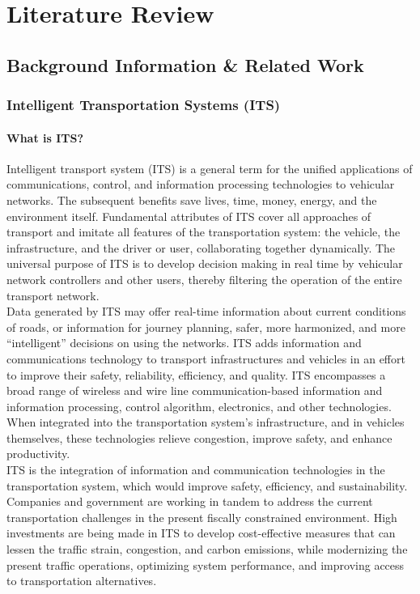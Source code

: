 \chapter{Literature Review}
	\label{chap: literature_review}
	
	\section{Background Information \& Related Work}
		\subsection{Intelligent Transportation Systems (ITS)}
			\subsubsection{What is ITS?}
			Intelligent transport system (ITS) is a general term for the unified applications of communications, control, and information processing technologies to vehicular networks. The subsequent benefits save lives, time, money, energy, and the environment itself. Fundamental attributes of ITS cover all approaches of transport and imitate all features of the transportation system: the vehicle, the infrastructure, and the driver or user, collaborating together dynamically. The universal purpose of ITS is to develop decision making in real time by vehicular network controllers and other users, thereby filtering the operation of the entire transport network. \\
			Data generated by ITS may offer real-time information about current conditions of roads, or information for journey planning, safer, more harmonized, and more “intelligent” decisions on using the networks. ITS adds information and communications technology to transport infrastructures and vehicles in an effort to improve their safety, reliability, efficiency, and quality. ITS encompasses a broad range of wireless and wire line communication-based information and information processing, control algorithm, electronics, and other technologies. When integrated into the transportation system’s infrastructure, and in vehicles themselves, these technologies relieve congestion, improve safety, and enhance productivity. \\
			ITS is the integration of information and communication technologies in the transportation system, which would improve safety, efficiency, and sustainability. Companies and government are working in tandem to address the current transportation challenges in the present fiscally constrained environment. High investments are being made in ITS to develop cost-effective measures that can lessen the traffic strain, congestion, and carbon emissions, while modernizing the present traffic operations, optimizing system performance, and improving access to transportation alternatives. \\

